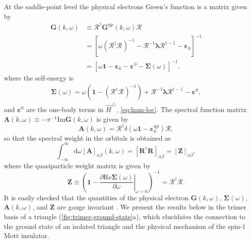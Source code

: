 \documentclass[reprint,aps,prb,amsmath,amssymb]{revtex4-2}
\begin{document}
At the saddle-point level the physical electrons Green's function is a matrix given by
%
\begin{align} \label{eq:greens-fnc}
\bm{G}(k,\omega) & \equiv \bm{\mathcal{R}}^{\dagger} \bm{G}^{\mathrm{qp}}(k,\omega) \bm{\mathcal{R}}^{} \nonumber \\
%
& = \left[ \omega (\bm{\mathcal{R}}^{\dagger} \bm{\mathcal{R}}^{})^{-1} - \bm{\mathcal{R}}^{-1} \bm{\lambda} \bm{\mathcal{R}}^{\dagger -1} - \bm{\varepsilon}_k  \right]^{-1} \nonumber \\
%
& = \left[ \omega \bm{1} - \bm{\varepsilon}_k - \bm{\varepsilon}^0 - \bm{\Sigma}(\omega) \right]^{-1},
\end{align}
%
where the self-energy is
%
\begin{align} \label{eq:self-energy}
\bm{\Sigma}(\omega) = \omega(\bm{1} - (\bm{\mathcal{R}}^{\dagger} \bm{\mathcal{R}}^{})^{-1}) + \bm{\mathcal{R}}^{-1} \bm{\lambda} \bm{\mathcal{R}}^{\dagger -1} - \bm{\varepsilon}^0,
\end{align}
%
and $\bm{\varepsilon}^0$ are the one-body terms in $\hat{H}^{\triangle}$, \cref{eq:ham-loc}. The spectral function matrix $\bm{A}(k,\omega) \equiv -\pi^{-1} \mathrm{Im} \bm{G}(k,\omega)$ is given by
%
\begin{equation} \label{eq:spectral-function}
\bm{A}(k,\omega) = \bm{\mathcal{R}}^{\dagger} \delta(\omega \bm{1} - \bm{\varepsilon}_k^{\mathrm{qp}}) \bm{\mathcal{R}},
\end{equation}
%
so that the spectral weight in the orbitals is obtained as
%
\begin{equation} \label{eq:spectral-weight}
\int_{-\infty}^{\infty} \mathrm{d} \omega [\bm{A}]_{\alpha\beta}(k,\omega) = [\bm{R}^{\dagger} \bm{R}^{}]_{\alpha \beta} =  [\bm{Z}]_{\alpha\beta},
\end{equation}
%
where the quasiparticle weight matrix is given by
%
\begin{equation} \label{eq:Z}
\bm{Z} \equiv \left( \bm{1} - \left. \frac{\partial \mathrm{Re} \bm{\Sigma}(\omega) }{\partial \omega} \right|_{\omega = 0} \right)^{-1} = \bm{\mathcal{R}}^{\dagger} \bm{\mathcal{R}}^{}.
\end{equation}
%
It is easily checked that the quantities of the physical electron $\bm{G}(k,\omega)$, $\bm{\Sigma}(\omega)$, $\bm{A}(k,\omega)$, and $\bm{Z}$ are gauge invariant \cite{Lechermann2007}. We present the results below in the trimer basis of a triangle (\cref{fig:trimer-ground-state}a), which elucidates the connection to the ground state of an isolated triangle and the physical mechanism of the spin-$1$ Mott insulator.
\end{document}
